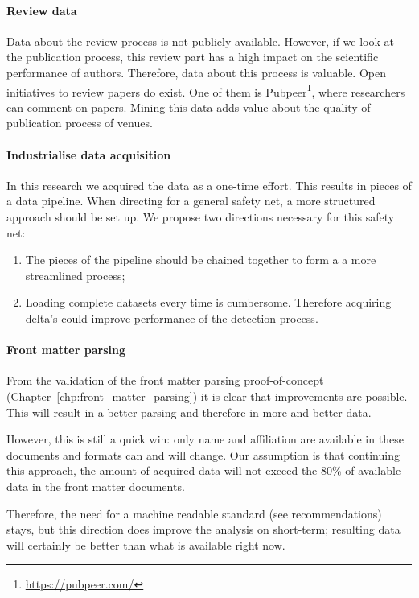 \documentclass{ou-report}
\begin{document}
\paragraph{Review data}
Data about the review process is not publicly available. However, if we look at
the publication process, this review part has a high impact on the scientific 
performance of authors. Therefore, data about this process is valuable.
Open initiatives to review papers do exist. One of them is
Pubpeer\footnote{\url{https://pubpeer.com/}}, 
where researchers can comment on papers.
Mining this data adds value about the quality of publication process of 
venues.

\paragraph{Industrialise data acquisition}
In this research we acquired the data as a one-time effort.
This results in pieces of a data pipeline.
When directing for a general safety net, a more structured approach should be 
set up. We propose two directions necessary for this safety net:
\begin{enumerate}
    \item The pieces of the pipeline should be chained together to form a
        a more streamlined process;
    \item Loading complete datasets every time is cumbersome. Therefore acquiring 
    delta’s could improve performance of the detection process.
\end{enumerate}

\paragraph{Front matter parsing}
From the validation of the front matter parsing proof-of-concept
(Chapter~\ref{chp:front_matter_parsing}) it is clear that improvements are 
possible. This will result in a better parsing and therefore in more and better 
data.

However, this is still a quick win: only name and affiliation are available in 
these documents and formats can and will change. Our assumption is that 
continuing this approach, the amount of acquired data will not exceed the 80\% 
of available data in the front matter documents.

Therefore, the need for a machine readable standard (see recommendations) stays, 
but this direction does improve the analysis on short-term; resulting data will 
certainly be better than what is available right now.
\end{document}
